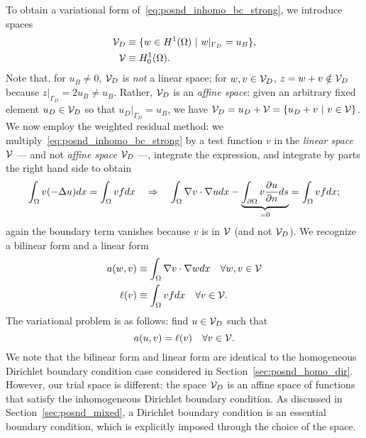 To obtain a variational form of~\eqref{eq:posnd_inhomo_bc_strong}, we introduce spaces
\begin{align*}
  \mathcal{V}_D &\equiv \{ w \in H^1(\Omega) \ | \ w|_{\Gamma_D} = u_B \}, \\
  \mathcal{V} &\equiv H^1_0(\Omega).
\end{align*}
Note that, for $u_B \neq 0$, $\mathcal{V}_D$ is \emph{not} a linear space; for $w,v \in \mathcal{V}_D$, $z = w + v \notin \mathcal{V}_D$ because $z|_{\Gamma_D} = 2 u_B \neq u_B$. Rather, $\mathcal{V}_D$ is an \emph{affine space}: given an arbitrary fixed element $u_D \in \mathcal{V}_D$ so that $u_D|_{\Gamma_D} = u_B$, we have $\calV_D = u_D + \calV = \{ u_D + v \ | \ v \in \calV \}$. We now employ the weighted residual method: we multiply~\eqref{eq:posnd_inhomo_bc_strong} by a test function $v$ in the \emph{linear space} $\mathcal{V}$ --- and not \emph{affine space} $\mathcal{V}_D$ ---, integrate the expression, and integrate by parts the right hand side to obtain
\begin{equation*}
  \int_{\Omega} v(-\Delta u) dx = \int_\Omega vf dx
  \quad \Rightarrow \quad
  \int_\Omega \nabla v \cdot \nabla u dx - \underbrace{ \int_{\partial \Omega} v \frac{\partial u}{\partial n} ds }_{= 0}
  = \int_\Omega v f dx;
\end{equation*}
again the boundary term vanishes because $v$ is in $\mathcal{V}$ (and not $\mathcal{V}_D$). 
We recognize a bilinear form and a linear form
\begin{align*}
  a(w,v) &\equiv \int_\Omega \nabla v \cdot \nabla w dx \quad \forall w,v \in \mathcal{V} \\
  \ell(v) &\equiv \int_\Omega vf dx \quad \forall v \in \mathcal{V}.
\end{align*}
The variational problem is as follows: find $u \in \mathcal{V}_D$ such that
\begin{equation}
  a(u,v) = \ell(v) \quad \forall v \in \mathcal{V}.
  \label{eq:posnd_inhomo_bc_var}
\end{equation}
We note that the bilinear form and linear form are identical to the homogeneous Dirichlet boundary condition case considered in Section~\ref{sec:posnd_homo_dir}.  However, our trial space is different; the space $\mathcal{V}_D$ is an affine space of functions that satisfy the inhomogeneous Dirichlet boundary condition.  As discussed in Section~\ref{sec:posnd_mixed}, a Dirichlet boundary condition is an essential boundary condition, which is explicitly imposed through the choice of the space. %

